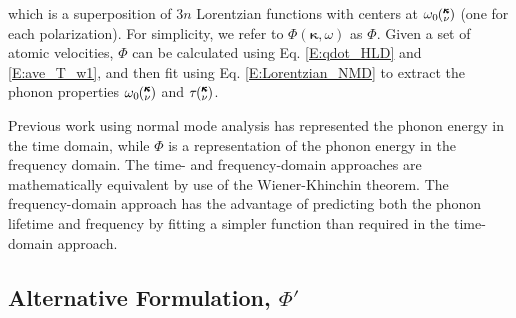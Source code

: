 \documentclass[12pt,twocolumn,iop]{/usr/share/texmf-texlive/tex/latex/iop/iopart}[/usr/share/texmf-texlive/tex/latex/iop/]
\newcommand{\kv}{\mspace{-4.0mu}\left(\mspace{-8.0mu}\begin{smallmatrix}&\pmb{\kappa} \\&\nu\end{smallmatrix}\mspace{-3.0mu}\right)}
\begin{document}
which is a superposition of $3n$ Lorentzian functions with centers at $\omega_0\kv$ (one for each polarization). For simplicity, we refer to $\Phi(\pmb{\kappa},\omega)$ as $\Phi$. Given a set of atomic velocities, $\Phi$ can be calculated using Eq$.$ \eqref{E:qdot_HLD} and \eqref{E:ave_T_w1}, and then fit using Eq$.$ \eqref{E:Lorentzian_NMD} to extract the phonon properties $\omega_0\kv$ and $\tau\kv$.

Previous work using normal mode analysis has represented the phonon energy in the time domain,\cite{ladd1986,mcgaughey2004c,henry2008,turney2009a,goicochea2010,He2011} while $\Phi$ is a representation of the phonon energy in the frequency domain. The time- and frequency-domain approaches are mathematically equivalent by use of the Wiener-Khinchin theorem.\cite{rudin1987,shiomi2011b} The frequency-domain approach has the advantage of predicting both the phonon lifetime and frequency by fitting a simpler function than required in the time-domain approach.

\subsection{\label{S:Subsection_Proposed_SED}Alternative Formulation, $\Phi'$}
\end{document}
